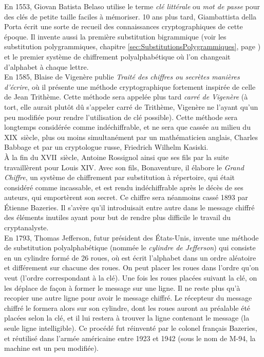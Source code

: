 En 1553, Giovan Batista Belaso utilise le terme \emph{clé littérale}
ou \emph{mot de passe} pour des clés de petite taille faciles à
mémoriser. %
10 ans plus tard, Giambattista della Porta écrit une sorte de recueil
des connaissances cryptographiques de cette époque. Il invente aussi
la première substitution bigrammique (voir les substitution
polygrammiques, chapitre \ref{sec:SubstitutionsPolygrammiques}, page
\pageref{sec:SubstitutionsPolygrammiques}) et le premier système de
chiffrement polyalphabétique où l'on changeait d'alphabet à
chaque lettre. \\

En 1585, Blaise de Vigenère publie \emph{Traité des chiffres
  ou secrètes manières d'écrire}, où il présente une méthode
cryptographique fortement inspirée de celle de Jean Trithème. Cette
méthode sera appelée plus tard \emph{carré de Vigenère} (à tort,
elle aurait plutôt dû s'appeler carré de Trithème, Vigenère ne
l'ayant qu'un peu modifiée pour rendre l'utilisation de clé possible).
Cette méthode sera longtemps considérée comme indéchiffrable, et ne
sera que cassée au milieu du XIX\ieme~siècle, plus ou moins
simultanément par un mathématicien anglais, Charles Babbage et
par un cryptologue russe, Friedrich Wilhelm Kasiski. \\

À la fin du XVII\ieme~siècle, Antoine Rossignol ainsi que ses
fils par la suite travaillèrent pour Louis XIV. Avec son fils,
Bonaventure, il élabore le \emph{Grand Chiffre}, un système de
chiffrement par substitution à répertoire, qui était considéré comme
incassable, et est rendu indéchiffrable après le décès de ses auteurs,
qui emportèrent son secret. Ce chiffre sera néanmoins cassé 1893 par
Étienne Bazeries. Il s'avère qu'il introduisait entre autre
dans le message chiffré des éléments inutiles ayant pour but de
rendre plus difficile le travail du cryptanalyste.\\

En 1793, Thomas Jefferson, futur président des États-Unis,
invente une méthode de substitution polyalphabétique (nommée le
\emph{cylindre de Jefferson}) qui consiste en
un cylindre formé de 26 roues, où est écrit l'alphabet dans un ordre
aléatoire et différement sur chacune des roues. On peut placer les
roues dans l'ordre qu'on veut (l'ordre correspondant à la clé).
Une fois les roues placées suivant la clé, on les déplace de façon à
former le message sur une ligne. Il ne reste plus qu'à recopier une
autre ligne pour avoir le message chiffré. Le récepteur du message
chiffré le formera alors sur son cylindre, dont les roues auront au
préalable été placées selon la clé, et il lui restera à trouver la
ligne contenant le message (la seule ligne intelligible). Ce procédé
fut réinventé par le colonel français Bazeries, et réutilisé
dans l'armée américaine entre 1923 et 1942 (sous le nom de M-94, la
machine est un peu modifiée).

